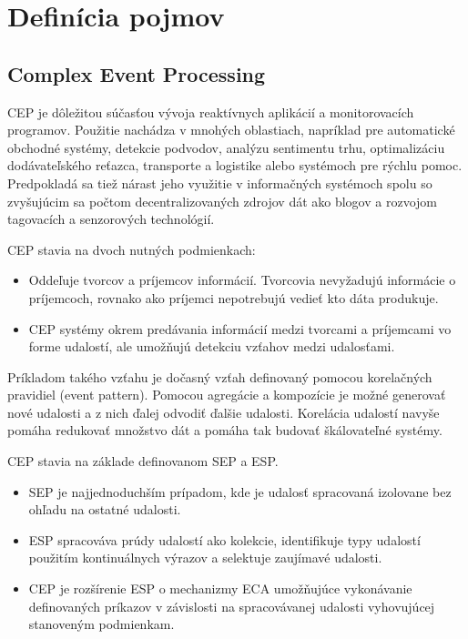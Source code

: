 \chapter{Definícia pojmov}

	\section{Complex Event Processing}
	\ac{CEP} je dôležitou súčasťou vývoja reaktívnych aplikácií a monitorovacích programov. Použitie nachádza v mnohých oblastiach, napríklad pre automatické obchodné systémy, detekcie podvodov, analýzu sentimentu trhu, optimalizáciu dodávateľského reťazca, transporte a logistike alebo systémoch pre rýchlu pomoc. Predpokladá sa tiež nárast jeho využitie v informačných systémoch spolu so zvyšujúcim sa počtom decentralizovaných zdrojov dát ako blogov a rozvojom tagovacích a senzorových technológií.
	
	\ac{CEP} stavia na dvoch nutných podmienkach:
	\begin{itemize}
		\item Oddeľuje tvorcov a príjemcov informácií. Tvorcovia nevyžadujú informácie o príjemcoch, rovnako ako príjemci nepotrebujú vedieť kto dáta produkuje.
		\item CEP systémy okrem predávania informácií medzi tvorcami a príjemcami vo forme udalostí, ale umožňujú detekciu vzťahov medzi udalosťami.
	\end{itemize}
	
	Príkladom takého vzťahu je dočasný vzťah definovaný pomocou korelačných pravidiel (event pattern). Pomocou agregácie a kompozície je možné generovať nové udalosti a z nich ďalej odvodiť ďalšie udalosti. Korelácia udalostí navyše pomáha redukovať množstvo dát a pomáha tak budovať škálovateľné systémy.
	
	\ac{CEP} stavia na základe definovanom \ac{SEP} a \ac{ESP}.
	\begin{itemize}
		\item SEP je najjednoduchším prípadom, kde je udalosť spracovaná izolovane bez ohľadu na ostatné udalosti.
		\item ESP spracováva prúdy udalostí ako kolekcie, identifikuje typy udalostí použitím kontinuálnych výrazov a selektuje zaujímavé udalosti.
		\item CEP je rozšírenie ESP o mechanizmy \ac{ECA} umožňujúce vykonávanie definovaných príkazov v závislosti na spracovávanej udalosti vyhovujúcej stanoveným podmienkam.
	\end{itemize}
	
